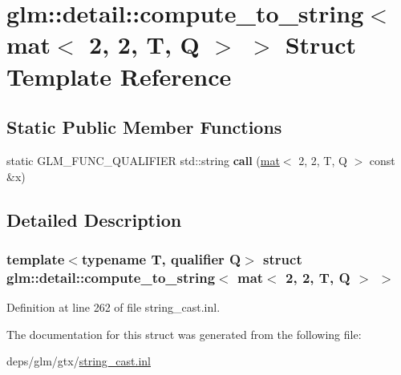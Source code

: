 \hypertarget{structglm_1_1detail_1_1compute__to__string_3_01mat_3_012_00_012_00_01T_00_01Q_01_4_01_4}{}\section{glm\+:\+:detail\+:\+:compute\+\_\+to\+\_\+string$<$ mat$<$ 2, 2, T, Q $>$ $>$ Struct Template Reference}
\label{structglm_1_1detail_1_1compute__to__string_3_01mat_3_012_00_012_00_01T_00_01Q_01_4_01_4}
\subsection*{Static Public Member Functions}
\begin{DoxyCompactItemize}
\item 
\mbox{\label{structglm_1_1detail_1_1compute__to__string_3_01mat_3_012_00_012_00_01T_00_01Q_01_4_01_4_a107a920bb722084d0518a0ff50e8c118}} 
static G\+L\+M\+\_\+\+F\+U\+N\+C\+\_\+\+Q\+U\+A\+L\+I\+F\+I\+ER std\+::string {\bfseries call} (\hyperlink{structglm_1_1mat}{mat}$<$ 2, 2, T, Q $>$ const \&x)
\end{DoxyCompactItemize}


\subsection{Detailed Description}
\subsubsection*{template$<$typename T, qualifier Q$>$\newline
struct glm\+::detail\+::compute\+\_\+to\+\_\+string$<$ mat$<$ 2, 2, T, Q $>$ $>$}



Definition at line 262 of file string\+\_\+cast.\+inl.



The documentation for this struct was generated from the following file\+:\begin{DoxyCompactItemize}
\item 
deps/glm/gtx/\hyperlink{string__cast_8inl}{string\+\_\+cast.\+inl}\end{DoxyCompactItemize}
